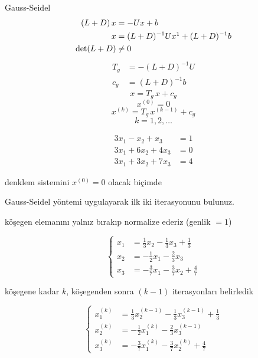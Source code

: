 \documentclass[11pt,a4paper]{article}
\begin{document}
Gauss-Seidel 
\begin{align*}
  (L+D)\,x&=-Ux+b\\
  x&=(L+D)^{-1}Ux\footnotemark+(L+D)^{-1}b\\
  \det(L+D)&\neq 0
\end{align*}
\begin{align*}
  T_g&=-(L+D)^{-1}U\\
  c_g&=(L+D)^{-1}b
\end{align*}
\[ x=T_g\,x+c_g \]
\[ x^{(0)}=0 \]
\[ x^{(k)}=T_g\,x^{(k-1)}+c_g \]
\[ k=1,2,\dots \]

\begin{ornek}
\noindent\begin{minipage}[c]{0.4\linewidth}
\[
  \begin{aligned}
    3x_1-x_2+x_3&=1\\
    3x_1+6x_2+4x_3&=0\\
    3x_1+3x_2+7x_3&=4
  \end{aligned}
\]
\end{minipage}\hfill
\begin{minipage}[c]{0.56\linewidth}
denklem sistemini $x^{(0)}=0$ olacak biçimde

Gauss-Seidel yöntemi uygulayarak ilk iki iterasyonunu bulunuz.
\end{minipage}
\end{ornek}

\noindent\begin{minipage}[c]{0.27\linewidth}
\small köşegen elemanını yalnız bırakıp normalize ederiz (genlik $=1$)
\end{minipage}\hfill
\begin{minipage}[c]{0.7\linewidth}
\[
  \left\{\begin{aligned}
    x_1&=\tfrac13x_2-\tfrac13x_3+\tfrac13\\[1mm]
    x_2&=-\tfrac12x_1-\tfrac23x_3\\[1mm]
    x_3&=-\tfrac37x_1-\tfrac37x_2+\tfrac47
  \end{aligned}\right.
\]
\end{minipage}

\medskip
\noindent\begin{minipage}[c]{0.27\linewidth}
\small köşegene kadar $k$, köşegenden sonra $(k-1)$ iterasyonları belirledik
\end{minipage}\hfill
\begin{minipage}[c]{0.7\linewidth}
\[
  \left\{\begin{aligned}
    x_1^{(k)}&=\tfrac13x_2^{(k-1)}-\tfrac13x_3^{(k-1)}+\tfrac13\\[1mm]
    x_2^{(k)}&=-\tfrac12x_1^{(k)}-\tfrac23x_3^{(k-1)}\\[1mm]
    x_3^{(k)}&=-\tfrac37x_1^{(k)}-\tfrac37x_2^{(k)}+\tfrac47
  \end{aligned}\right.
\]
\end{minipage}
\end{document}
